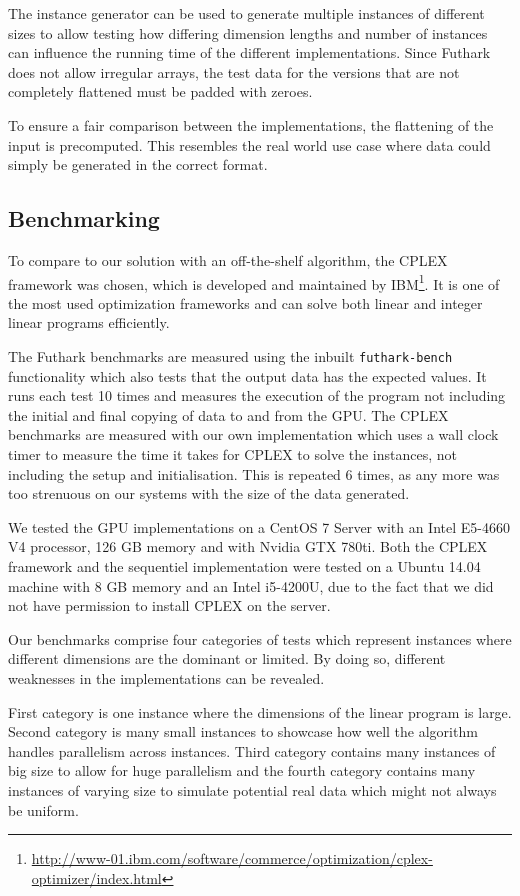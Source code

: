 \newpar The instance generator can be used to generate multiple instances of different sizes to allow testing how differing dimension lengths and number of instances can influence the running time of the different implementations. Since Futhark does not allow irregular arrays, the test data for the versions that are not completely flattened must be padded with zeroes.

To ensure a fair comparison between the implementations, the flattening of the input is precomputed. This resembles the real world use case where data could simply be generated in the correct format.

\subsection{Benchmarking}
To compare to our solution with an off-the-shelf algorithm, the CPLEX framework was chosen, which is developed and maintained by IBM\footnote{\url{http://www-01.ibm.com/software/commerce/optimization/cplex-optimizer/index.html}}. It is one of the most used optimization frameworks and can solve both linear and integer linear programs efficiently.

The Futhark benchmarks are measured using the inbuilt \texttt{futhark-bench} functionality which also tests that the output data has the expected values. It runs each test 10 times and measures the execution of the program not including the initial and final copying of data to and from the GPU. The CPLEX benchmarks are measured with our own implementation which uses a wall clock timer to measure the time it takes for CPLEX to solve the instances, not including the setup and initialisation. This is repeated 6 times, as any more was too strenuous on our systems with the size of the data generated.

We tested the GPU implementations on a CentOS 7 Server with an Intel E5-4660 V4 processor, 126 GB memory and with Nvidia GTX 780ti. Both the CPLEX framework and the sequentiel 
implementation were tested on a Ubuntu 14.04 machine with 8 GB memory and an Intel i5-4200U, due to the fact that we did not have permission to install CPLEX on the server.

\newpar Our benchmarks comprise four categories of tests which represent instances where different dimensions are the dominant or limited. By doing so, different weaknesses in the implementations can be revealed.

First category is one instance where the dimensions of the linear program is large. Second category is many small instances to showcase how well the algorithm handles parallelism across instances. Third category contains many instances of big size to allow for huge parallelism and the fourth category contains many instances of varying size to simulate potential real data which might not always be uniform.